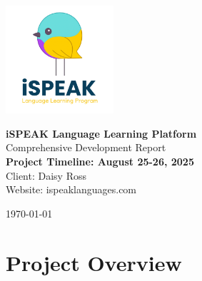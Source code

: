 \documentclass[11pt,a4paper]{article}
\begin{document}
\begin{titlepage}
    \centering
    \vspace*{1cm}
    \includegraphics[width=0.3\textwidth]{public/images/logos/ispeak-logo-with-text.png}
    \vspace{2cm}
    
    {\Huge\bfseries\color{darkblue} iSPEAK Language Learning Platform\\}
    \vspace{0.5cm}
    {\Large\color{teal} Comprehensive Development Report\\}
    \vspace{1.5cm}
    {\large\bfseries Project Timeline: August 25-26, 2025\\}
    \vspace{1cm}
    {\large Client: Daisy Ross\\}
    \vspace{0.5cm}
    {\large Website: ispeaklanguages.com\\}
    \vspace{3cm}
    
    \begin{abstract}
    \noindent\textbf{Executive Summary:} This report documents the comprehensive development work completed on the iSPEAK Language Learning Platform over a two-day period. The project involved implementing a full donation system with Supabase backend integration, creating an administrative dashboard, modernizing the navigation system, and polishing the user interface for production readiness. All implementations follow modern web development best practices with a focus on user experience, accessibility, and maintainability.
    \end{abstract}
    
    \vfill
    {\large \today}
\end{titlepage}

\newpage
\tableofcontents
\thispagestyle{fancy}
\newpage

\section{Project Overview}
\end{document}
